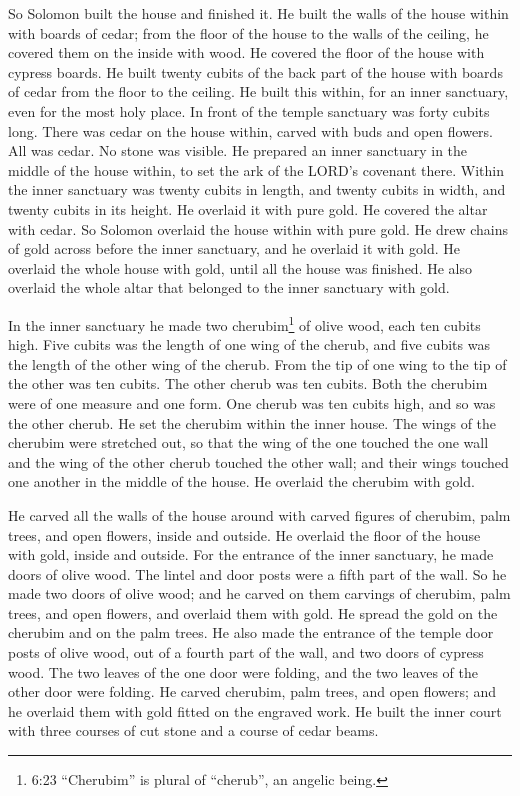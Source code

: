  So Solomon built the house and finished it. 
He built the walls of the house within with boards of cedar; from the
floor of the house to the walls of the ceiling, he covered them on the
inside with wood. He covered the floor of the house with cypress boards.
 He built twenty cubits of the back part of the house with
boards of cedar from the floor to the ceiling. He built this within, for
an inner sanctuary, even for the most holy place.  In front
of the temple sanctuary was forty cubits long.  There was
cedar on the house within, carved with buds and open flowers. All was
cedar. No stone was visible.  He prepared an inner
sanctuary in the middle of the house within, to set the ark of the
LORD's covenant there.  Within the inner sanctuary was
twenty cubits in length, and twenty cubits in width, and twenty cubits
in its height. He overlaid it with pure gold. He covered the altar with
cedar.  So Solomon overlaid the house within with pure
gold. He drew chains of gold across before the inner sanctuary, and he
overlaid it with gold.  He overlaid the whole house with
gold, until all the house was finished. He also overlaid the whole altar
that belonged to the inner sanctuary with gold.

 In the inner sanctuary he made two cherubim\footnote{6:23
  ``Cherubim'' is plural of ``cherub'', an angelic being.} of olive
wood, each ten cubits high.  Five cubits was the length of
one wing of the cherub, and five cubits was the length of the other wing
of the cherub. From the tip of one wing to the tip of the other was ten
cubits.  The other cherub was ten cubits. Both the cherubim
were of one measure and one form.  One cherub was ten
cubits high, and so was the other cherub.  He set the
cherubim within the inner house. The wings of the cherubim were
stretched out, so that the wing of the one touched the one wall and the
wing of the other cherub touched the other wall; and their wings touched
one another in the middle of the house.  He overlaid the
cherubim with gold.

 He carved all the walls of the house around with carved
figures of cherubim, palm trees, and open flowers, inside and outside.
 He overlaid the floor of the house with gold, inside and
outside.  For the entrance of the inner sanctuary, he made
doors of olive wood. The lintel and door posts were a fifth part of the
wall.  So he made two doors of olive wood; and he carved on
them carvings of cherubim, palm trees, and open flowers, and overlaid
them with gold. He spread the gold on the cherubim and on the palm
trees.  He also made the entrance of the temple door posts
of olive wood, out of a fourth part of the wall,  and two
doors of cypress wood. The two leaves of the one door were folding, and
the two leaves of the other door were folding.  He carved
cherubim, palm trees, and open flowers; and he overlaid them with gold
fitted on the engraved work.  He built the inner court with
three courses of cut stone and a course of cedar beams.

